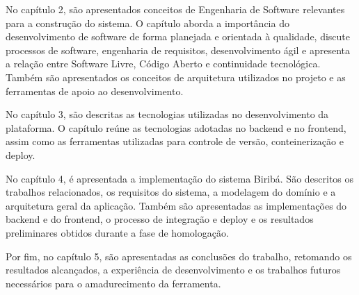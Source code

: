 No capítulo 2, são apresentados conceitos de Engenharia de Software relevantes para a construção do sistema. O capítulo aborda a importância do desenvolvimento de software de forma planejada e orientada à qualidade, discute processos de software, engenharia de requisitos, desenvolvimento ágil e apresenta a relação entre Software Livre, Código Aberto e continuidade tecnológica. Também são apresentados os conceitos de arquitetura utilizados no projeto e as ferramentas de apoio ao desenvolvimento.

No capítulo 3, são descritas as tecnologias utilizadas no desenvolvimento da plataforma. O capítulo reúne as tecnologias adotadas no backend e no frontend, assim como as ferramentas utilizadas para controle de versão, conteinerização e deploy.

No capítulo 4, é apresentada a implementação do sistema Biribá. São descritos os trabalhos relacionados, os requisitos do sistema, a modelagem do domínio e a arquitetura geral da aplicação. Também são apresentadas as implementações do backend e do frontend, o processo de integração e deploy e os resultados preliminares obtidos durante a fase de homologação.

Por fim, no capítulo 5, são apresentadas as conclusões do trabalho, retomando os resultados alcançados, a experiência de desenvolvimento e os trabalhos futuros necessários para o amadurecimento da ferramenta.
